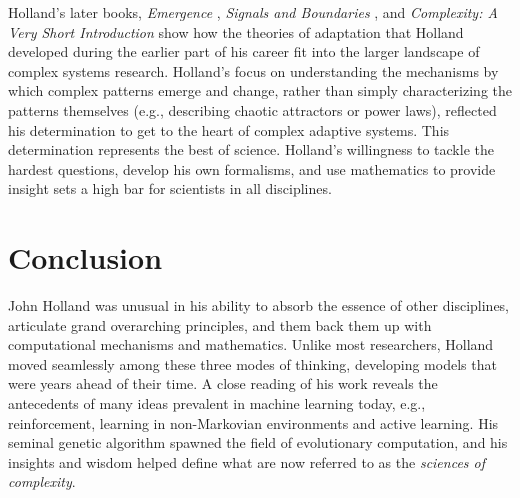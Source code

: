 \documentclass{sig-alternate}
\begin{document}



Holland's later books, \emph{Emergence} \cite{Holland2000},
\emph{Signals and Boundaries} \cite{Holland2012}, and
\emph{Complexity: A Very Short Introduction} \cite{Holland2014} show how the
theories of adaptation that Holland developed during the earlier part
of his career fit into the larger landscape of complex systems
research.  Holland's focus on understanding the mechanisms by which complex patterns emerge and change,
rather than simply characterizing the patterns themselves (e.g.,
describing chaotic attractors or power laws), reflected his
determination to get to the heart of complex adaptive systems.
This determination represents the best of science.  Holland's
willingness to tackle the hardest questions, develop his own
formalisms, and use mathematics to provide insight sets a high bar for
scientists in all disciplines.



\section{Conclusion}

John Holland was unusual in his ability to absorb the essence of other
disciplines, articulate grand overarching
principles, and them back them up with computational mechanisms and
mathematics.  Unlike most researchers, Holland moved seamlessly among these
three modes of thinking, developing models that were years ahead of their time.  A
close reading of his work reveals the antecedents of many ideas prevalent in
machine learning today, e.g., reinforcement, learning in non-Markovian
environments and active learning.   His seminal genetic algorithm
spawned the field of evolutionary computation, and his insights
and wisdom helped define what are now referred to as the
\emph{sciences of complexity}.   
\end{document}
